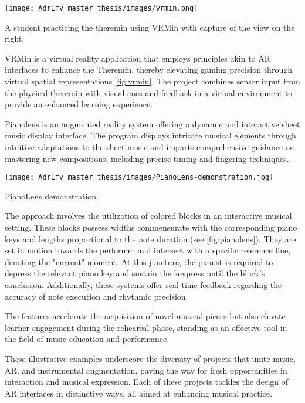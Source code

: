 \begin{marginfigure}
    \centering
    \texttt{[image: AdrLfv\_master\_thesis/images/vrmin.png]}
    \caption{A student practicing the theremin using VRMin with capture of the view on the right.}
    \label{fig:vrmin}
\end{marginfigure}

VRMin \cite{johnson2017vrmin} is a virtual reality application that employs principles akin to AR interfaces to enhance the Theremin, thereby elevating gaming precision through virtual spatial representations \ref{fig:vrmin}. The project combines sensor input from the physical theremin with visual cues and feedback in a virtual environment to provide an enhanced learning experience. 

Pianolens is an augmented reality system offering a dynamic and interactive sheet music display interface. The program displays intricate musical elements through intuitive adaptations to the sheet music and imparts comprehensive guidance on mastering new compositions, including precise timing and fingering techniques. 

\begin{marginfigure}
    \centering
    \texttt{[image: AdrLfv\_master\_thesis/images/PianoLens-demonstration.jpg]}
    \caption{PianoLens demonstration.}
    \label{fig:pianolens}
\end{marginfigure}

The approach involves the utilization of colored blocks in an interactive musical setting. These blocks possess widths commensurate with the corresponding piano keys and lengths proportional to the note duration (see \ref{fig:pianolens}). They are set in motion towards the performer and intersect with a specific reference line, denoting the "current" moment. At this juncture, the pianist is required to depress the relevant piano key and sustain the keypress until the block's conclusion. Additionally, these systems offer real-time feedback regarding the accuracy of note execution and rhythmic precision.

The features accelerate the acquisition of novel musical pieces but also elevate learner engagement during the rehearsal phase, standing as an effective tool in the field of music education and performance.

These illustrative examples underscore the diversity of projects that unite music, AR, and instrumental augmentation, paving the way for fresh opportunities in interaction and musical expression. Each of these projects tackles the design of AR interfaces in distinctive ways, all aimed at enhancing musical practice.


